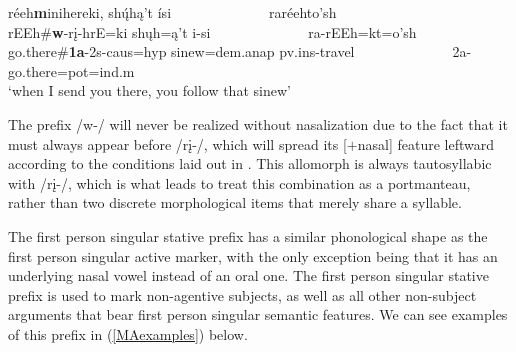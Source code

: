 \begin{exe}
\begin{xlist}
	\item \glll réeh\textbf{m}inihereki, shų́hą't ísi ~ ~ ~ ~ ~ ~ ~ ~ raréehto'sh\\
	rEEh\#\textbf{w}-rį-hrE=ki shųh=ą't i-si ~ ~ ~ ~ ~ ~ ~ ~ ra-rEEh=kt=o'sh\\
	\textnormal{go.there}\#\textbf{1a}-2s-caus=hyp \textnormal{sinew}=dem.anap {pv.ins}-\textnormal{travel} ~ ~ ~ ~ ~ ~ ~ ~ 2a-\textnormal{go.there}=pot=ind.m\\
	\glt `when I send you there, you follow that sinew' \citep[309]{hollow1973a}
	
	\end{xlist}
	
\end{exe}

The prefix /w-/ will never be realized without nasalization due to the fact that it must always appear before /rį-/, which will spread its [$+$nasal] feature leftward according to the conditions laid out in . This allomorph is always tautosyllabic with /rį-/, which is what leads \citet[10]{kennard1936} to treat this combination as a portmanteau, rather than two discrete morphological items that merely share a syllable.

\label{Para1S}

The first person singular stative prefix has a similar phonological shape as the first person singular active marker, with the only exception being that it has an underlying nasal vowel instead of an oral one. The first person singular stative prefix is used to mark non-agentive subjects, as well as all other non-subject arguments that bear first person singular semantic features. We can see examples of this prefix in (\ref{MAexamples}) below.

